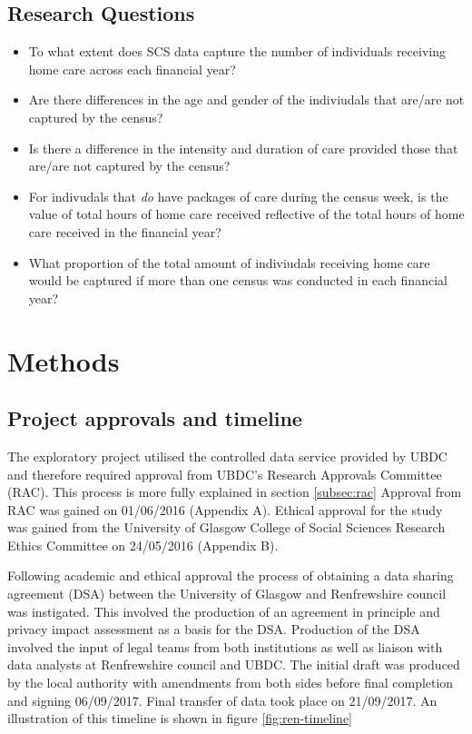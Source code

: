 \documentclass[]{article}
\begin{document}
\FloatBarrier
\subsection{Research Questions}\label{subsec:renfrew-qs}

\begin{itemize}[noitemsep]
\item To what extent does SCS data capture the number of individuals receiving home care across each financial year?
\item Are there differences in the age and gender of the indiviudals that are/are not captured by the census?
\item Is there a difference in the intensity and duration of care provided those that are/are not captured by the census?
\item For indivudals that \emph{do} have packages of care during the census week, is the value of total hours of home care received reflective of the total hours of home care received in the financial year?
\item What proportion of the total amount of indiviudals receiving home care would be captured if more than one census was conducted in each financial year?
\end{itemize}

\section{Methods}\label{sec:renf-methods}

\subsection{Project approvals and timeline}\label{subsec:renf-methods-approvals}

The exploratory project utilised the controlled data service provided by
UBDC and therefore required approval from UBDC's Research Approvals
Committee (RAC). This process is more fully explained in section
\ref{subsec:rac} Approval from RAC was gained on 01/06/2016 (Appendix
A). Ethical approval for the study was gained from the University of
Glasgow College of Social Sciences Research Ethics Committee on
24/05/2016 (Appendix B).

Following academic and ethical approval the process of obtaining a data
sharing agreement (DSA) between the University of Glasgow and
Renfrewshire council was instigated. This involved the production of an
agreement in principle and privacy impact assessment as a basis for the
DSA. Production of the DSA involved the input of legal teams from both
institutions as well as liaison with data analysts at Renfrewshire
council and UBDC. The initial draft was produced by the local authority
with amendments from both sides before final completion and signing
06/09/2017. Final transfer of data took place on 21/09/2017. An
illustration of this timeline is shown in figure \ref{fig:ren-timeline}
\end{document}
